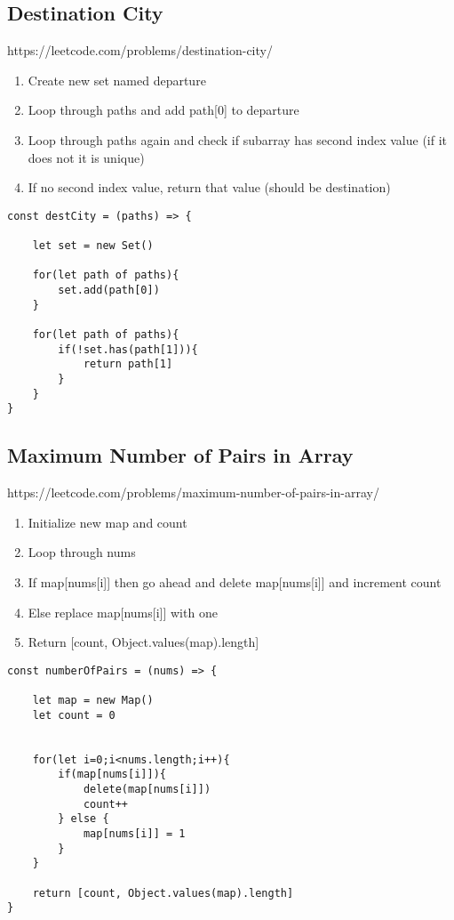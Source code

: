 \documentclass[10pt]{article}
\begin{document}
\medskip 
\subsection{Destination City}
https://leetcode.com/problems/destination-city/

\begin{enumerate}
	\item Create new set named departure
	\item Loop through paths and add path[0] to departure
	\item Loop through paths again and check if subarray has second index value (if it does not it is unique)
	\item If no second index value, return that value (should be destination)
\end{enumerate}

\begin{lstlisting}[title=Solution destCity, captionpos=t]
const destCity = (paths) => {
    
    let set = new Set()
    
    for(let path of paths){
        set.add(path[0])
    }
    
    for(let path of paths){
        if(!set.has(path[1])){
            return path[1]
        }
    }
}
\end{lstlisting}
\medskip %





\pagebreak %
\medskip   
\subsection{Maximum Number of Pairs in Array}
https://leetcode.com/problems/maximum-number-of-pairs-in-array/

\begin{enumerate}
	\item Initialize new map and count
	\item Loop through nums
	\item If map[nums[i]] then go ahead and delete map[nums[i]] and increment count
	\item Else replace map[nums[i]] with one
	\item Return [count, Object.values(map).length]
\end{enumerate}

\begin{lstlisting}[title=Solution numberOfPairs, captionpos=t]
const numberOfPairs = (nums) => {
    
    let map = new Map()
    let count = 0
    
    
    for(let i=0;i<nums.length;i++){
        if(map[nums[i]]){
            delete(map[nums[i]])
            count++
        } else {
            map[nums[i]] = 1
        }
    }

    return [count, Object.values(map).length]
}
\end{lstlisting}
\medskip %
\end{document}
